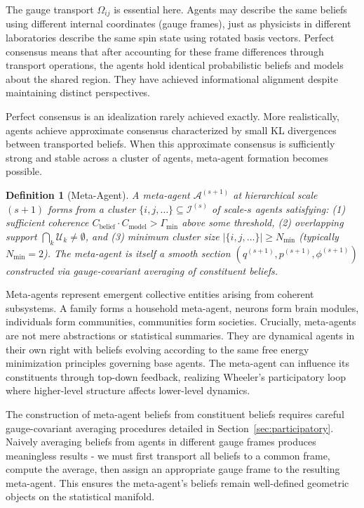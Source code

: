 \documentclass[11pt]{article}
\newtheorem{definition}{Definition}
\begin{document}
The gauge transport $\Omega_{ij}$ is essential here. Agents may describe the same beliefs using different internal coordinates (gauge frames), just as physicists in different laboratories describe the same spin state using rotated basis vectors. Perfect consensus means that after accounting for these frame differences through transport operations, the agents hold identical probabilistic beliefs and models about the shared region. They have achieved informational alignment despite maintaining distinct perspectives.

Perfect consensus is an idealization rarely achieved exactly. More realistically, agents achieve approximate consensus characterized by small KL divergences between transported beliefs. When this approximate consensus is sufficiently strong and stable across a cluster of agents, meta-agent formation becomes possible.

\begin{definition}[Meta-Agent]
A meta-agent $\mathcal{A}^{(s+1)}$ at hierarchical scale $(s+1)$ forms from a cluster $\{i, j, \ldots\} \subseteq \mathcal{I}^{(s)}$ of scale-$s$ agents satisfying: (1) sufficient coherence $C_{\text{belief}} \cdot C_{\text{model}} > \Gamma_{\min}$ above some threshold, (2) overlapping support $\bigcap_k \mathcal{U}_k \neq \emptyset$, and (3) minimum cluster size $|\{i, j, \ldots\}| \geq N_{\min}$ (typically $N_{\min} = 2$). The meta-agent is itself a smooth section $(q^{(s+1)}, p^{(s+1)}, \phi^{(s+1)})$ constructed via gauge-covariant averaging of constituent beliefs.
\end{definition}

Meta-agents represent emergent collective entities arising from coherent subsystems. A family forms a household meta-agent, neurons form brain modules, individuals form communities, communities form societies. Crucially, meta-agents are not mere abstractions or statistical summaries. They are dynamical agents in their own right with beliefs evolving according to the same free energy minimization principles governing base agents. The meta-agent can influence its constituents through top-down feedback, realizing Wheeler's participatory loop where higher-level structure affects lower-level dynamics.

The construction of meta-agent beliefs from constituent beliefs requires careful gauge-covariant averaging procedures detailed in Section~\ref{sec:participatory}. Naively averaging beliefs from agents in different gauge frames produces meaningless results - we must first transport all beliefs to a common frame, compute the average, then assign an appropriate gauge frame to the resulting meta-agent. This ensures the meta-agent's beliefs remain well-defined geometric objects on the statistical manifold.
\end{document}
